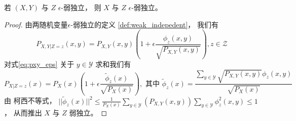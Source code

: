 \begin{lemma}\label{lem:xyz}
	若 $(X,Y)$ 与 $Z$ $\epsilon$-弱独立，
  则 $X$ 与 $Z$ $\epsilon$-弱独立。
\end{lemma}
\begin{proof}
	由两随机变量$\epsilon$-弱独立的定义 \ref{def:weak_indepedent}，
  我们有
	\begin{equation}\label{eq:pxy_eps}
	P_{X,Y|Z=z}(x,y) = P_{X,Y}(x,y)\left(1+\epsilon \frac{\phi_z(x,y)}{\sqrt{P_{X,Y}(x,y)}}
  \right), z \in \mathcal{Z}
	\end{equation}
	对式\eqref{eq:pxy_eps} 关于 $y\in \mathcal{Y}$ 求和我们有
	\begin{equation}
	P_{X|Z=z}(x) = P_X(x)\left(1+\epsilon\frac{\tilde{\phi}_z(x)}{\sqrt{P_X(x)}} \right),
	\textrm{ 其中 } \tilde{\phi}_z(x) = \frac{\sum_{y\in \mathcal{Y}} \sqrt{P_{X,Y}(x,y) }\phi_z(x,y)}{\sqrt{P_X(x)}}
	\end{equation}
	由 柯西不等式，
  $||\tilde{\phi}_z(x)||^2 \leq \frac{1}{P_X(x)}
	\sum_{y\in \mathcal{Y}}(P_{X,Y}(x,y))
	\sum_{y\in \mathcal{Y}} \phi_z^2(x,y) \leq 1
	$，
	从而推出 $X$  与 $Z$ 弱独立。
\end{proof}
